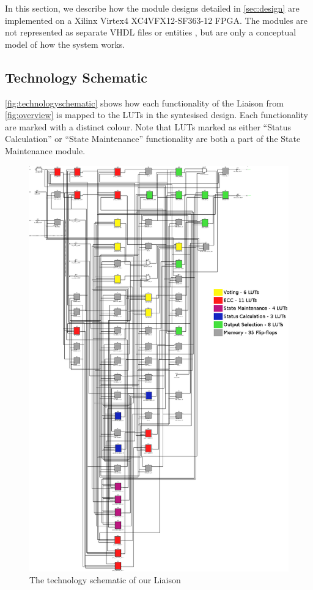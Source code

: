 In this section, we describe how the module designs detailed in
\autoref{sec:design} are implemented on a Xilinx Virtex4
XC4VFX12-SF363-12 FPGA. The modules are not represented as separate
VHDL files or entities , but are only a conceptual model of how the
system works.

\subsection{Technology Schematic}
\label{sec:technologyschematic}

\autoref{fig:technologyschematic} shows how each functionality
of the Liaison from \autoref{fig:overview} is mapped to the LUTs in
the syntesised design.  Each functionality are marked with a distinct
colour. Note that LUTs marked as either ``Status Calculation'' or
``State Maintenance'' functionality are both a part of the State
Maintenance module.


\begin{figure}[p]
  \vspace*{-1.2in}
  \centerline{ \includegraphics[width=1.2\textwidth]{LUT-count} }
  \caption{The technology schematic of our Liaison}
  \label{fig:technologyschematic}
\end{figure}

